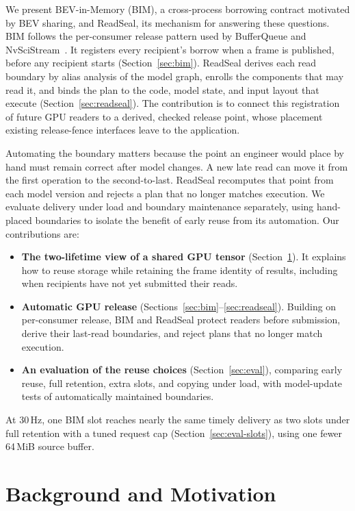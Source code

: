 \documentclass[conference]{IEEEtran}
\newcommand{\MiB}{\,MiB}
\newcommand{\Hz}{\,Hz}
\begin{document}
We present BEV-in-Memory (BIM), a cross-process borrowing contract motivated by BEV sharing, and ReadSeal, its mechanism for answering these questions. BIM follows the per-consumer release pattern used by BufferQueue and NvSciStream~\cite{bufferqueue,nvscistream}. It registers every recipient's borrow when a frame is published, before any recipient starts (Section~\ref{sec:bim}). ReadSeal derives each read boundary by alias analysis of the model graph, enrolls the components that may read it, and binds the plan to the code, model state, and input layout that execute (Section~\ref{sec:readseal}). The contribution is to connect this registration of future GPU readers to a derived, checked release point, whose placement existing release-fence interfaces leave to the application.

Automating the boundary matters because the point an engineer would place by hand must remain correct after model changes. A new late read can move it from the first operation to the second-to-last. ReadSeal recomputes that point from each model version and rejects a plan that no longer matches execution. We evaluate delivery under load and boundary maintenance separately, using hand-placed boundaries to isolate the benefit of early reuse from its automation. Our contributions are:
\begin{itemize}
\item \textbf{The two-lifetime view of a shared GPU tensor} (Section~\ref{sec:motivation}). It explains how to reuse storage while retaining the frame identity of results, including when recipients have not yet submitted their reads.
\item \textbf{Automatic GPU release} (Sections~\ref{sec:bim}--\ref{sec:readseal}). Building on per-consumer release, BIM and ReadSeal protect readers before submission, derive their last-read boundaries, and reject plans that no longer match execution.
\item \textbf{An evaluation of the reuse choices} (Section~\ref{sec:eval}), comparing early reuse, full retention, extra slots, and copying under load, with model-update tests of automatically maintained boundaries.
\end{itemize}

At 30\Hz, one BIM slot reaches nearly the same timely delivery as two slots under full retention with a tuned request cap (Section~\ref{sec:eval-slots}), using one fewer 64\MiB{} source buffer.

\section{Background and Motivation}
\label{sec:motivation}
\end{document}
